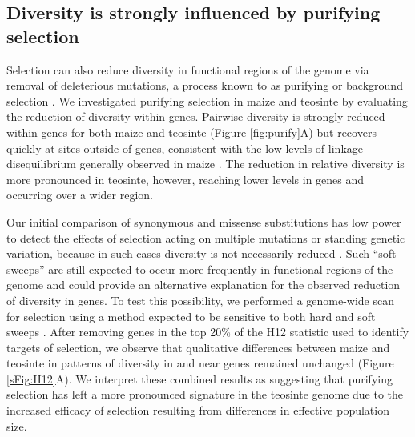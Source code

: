 \documentclass{pnastwo}
\begin{document}
\begin{article}
\subsection{Diversity is strongly influenced by purifying selection}

Selection can also reduce diversity in functional regions of the genome via removal of deleterious mutations, a process known to as purifying or background selection \cite{charlesworth1993}.
We investigated purifying selection in maize and teosinte by evaluating the reduction of diversity within genes.
Pairwise diversity is strongly reduced within genes for both maize and teosinte (Figure \ref{fig:purify}A) but recovers quickly at sites outside of genes, consistent with the low levels of linkage disequilibrium generally observed in maize \cite{tenaillon2002,chia2012}. 
The reduction in relative diversity is more pronounced in teosinte, however, reaching lower levels in genes and occurring over a wider region.  

Our initial comparison of synonymous and missense substitutions has low power to detect the effects of selection acting on multiple mutations or standing genetic variation, because in such cases diversity is not necessarily reduced \cite{innan2004,messer2013}. 
Such ``soft sweeps'' are still expected to occur more frequently in functional regions of the genome and could provide an alternative explanation for the observed reduction of diversity in genes. 
To test this possibility, we performed a genome-wide scan for selection using a method expected to be sensitive to both hard and soft sweeps \cite{garud2015}. 
After removing genes in the top 20\% of the H12 statistic used to identify targets of selection, we observe that qualitative differences between maize and teosinte in patterns of diversity in and near genes remained unchanged (Figure \ref{sFig:H12}A).
We interpret these combined results as suggesting that purifying selection has left a more pronounced signature in the teosinte genome due to the increased efficacy of selection resulting from differences in effective population size.


\end{article}
\end{document}
